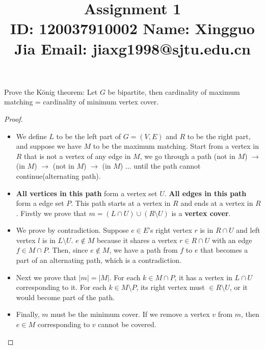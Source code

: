 \documentclass{article}
\title{{\bf Assignment 1} \\ {\large ID: 120037910002 } {\large Name: Xingguo Jia } {\large Email: jiaxg1998@sjtu.edu.cn}}
\author{}
\date{}
\newcounter{exercise}
\newcommand{\<}{
    \langle}
\renewcommand{\>}{
    \rangle}
\begin{document}
\maketitle


{\large





\begin{exercise}
Prove the K\"onig theorem: Let $G$ be bipartite, then cardinality of maximum matching = cardinality of minimum vertex cover.

\end{exercise}
\begin{proof} 
    \leavevmode\newline
\begin{itemize}

\item We define $L$ to be the left part of $G=(V,E)$ and $R$ to be the right part, and suppose we have $M$ to be the maximum matching. Start from a vertex in $R$ that is not a vertex of any edge in $M$, we go through a path (not in $M$) $\rightarrow$ (in $M$) $\rightarrow$  (not in $M$) $\rightarrow$ (in $M$) $\ldots$ until the path cannot continue(alternating path). 

\item \textbf{All vertices in this path } form a vertex set $U$. \textbf{All edges in this path} form a edge set $P$. This path starts at a vertex in $R$ and ends at a vertex in $R$. Firstly we prove that $m=(L \cap U) \cup (R \setminus U)$ is a \textbf{vertex cover}.

\item We prove by contradiction. Suppose $e \in E$'s right vertex $r$ is in $R\cap U$ and left vertex $l$ is in $L\setminus U$. $e\notin M$ because it shares a vertex $r\in R\cap U$ with an edge $f\in M \cap P$. Then, since $e \notin M$, we have a path from $f$ to $e$ that becomes a part of an alternating path, which is a contradiction.

\item Next we prove that $|m| = |M|$. For each $k \in M \cap P$, it has a vertex in $L\cap U$ corresponding to it. For each $k \in M \setminus P$, its right vertex must $\in R \setminus U$, or it would become part of the path.

\item Finally, $m$ must be the minimum cover. If we remove a vertex $v$ from $m$, then $e \in M$ corresponding to $v$ cannot be covered. 
\end{itemize}
\end{proof}

}
\end{document}
